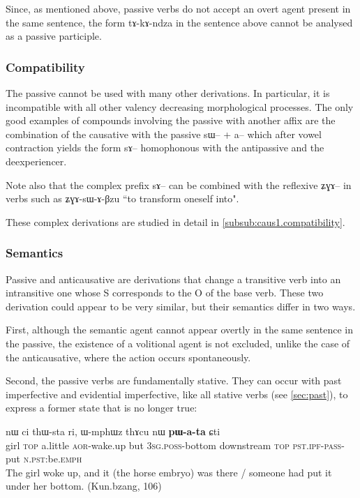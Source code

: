 \documentclass[oldfontcommands,oneside,a4paper,11pt]{memoir}
\newcommand{\ipa}[1]{{\phon #1}} %
\newcommand{\aor}{\textsc{aor}}
\newcommand{\emphat}{\textsc{emph}}
\newcommand{\ipf}{\textsc{ipf}}
\newcommand{\npst}{\textsc{n.pst}}
\newcommand{\pass}{\textsc{pass}}
\newcommand{\poss}{\textsc{poss}}
\newcommand{\pst}{\textsc{pst}}
\newcommand{\sg}{\textsc{sg}}
\newcommand{\topic}{\textsc{top}}
\begin{document}
 Since, as mentioned above, passive verbs do not accept an overt agent present in the same sentence, the form \ipa{tɤ-kɤ-ndza} in the sentence above cannot be analysed as a passive participle.
 
  

\subsubsection{Compatibility}  \label{subsub:passive.compat}
The passive cannot be used with many other derivations. In particular, it is incompatible with all other valency decreasing morphological processes. The only good examples of compounds involving the passive with another affix are the combination of the causative with the passive \ipa{sɯ}-- + \ipa{a}-- which after vowel contraction yields the form \ipa{sɤ}-- homophonous with the antipassive and the deexperiencer. 

Note also that the complex prefix \ipa{sɤ}-- can be combined with the reflexive \ipa{ʑɣɤ}-- in verbs such as \ipa{ʑɣɤ-sɯ-ɤ-βzu} ``to transform oneself into".

These complex derivations are studied in detail in \ref{subsub:caus1.compatibility}.

\subsubsection{Semantics}  \label{subsub:passive.semantics}
Passive and anticausative are derivations that change a transitive verb into an intransitive one whose S corresponds to the O of the base verb. These two derivation could appear to be very similar, but their semantics differ in two ways. 

First, although the semantic agent cannot appear overtly in the same sentence in the passive, the existence of a volitional agent is not excluded, unlike the case of the anticausative, where the action occurs spontaneously.

Second, the passive verbs are fundamentally stative. They can occur with past imperfective and evidential imperfective, like all stative verbs (see \ref{sec:past}), to express a former state that is no longer true:

 
\begin{exe}
\ex
\gll   \ipa{tɕheme} 	\ipa{nɯ} 	\ipa{ci} 	\ipa{thɯ-sta} 	\ipa{ri,} 	\ipa{ɯ-mphɯz} 	\ipa{thɤcu} 	\ipa{nɯ} 	\textbf{\ipa{pɯ-a-ta}} 	\ipa{ɕti}    \\
  girl \topic{} a.little \aor{}-wake.up but 3\sg{}.\poss{}-bottom downstream \topic{}    \pst{}.\ipf{}-\pass{}-put \npst{}:be.\emphat{}\\
 \glt   The girl woke up, and it (the horse embryo) was there / someone had put it under her bottom.  (Kun.bzang, 106)
\end{exe} 
 	 
\end{document}

